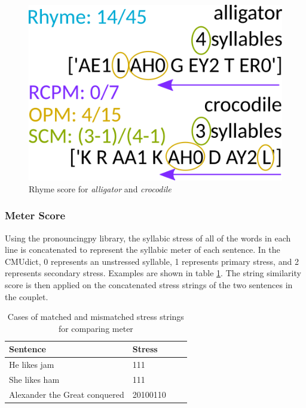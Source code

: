 \documentclass[11pt,a4paper]{article}
\begin{document}
\begin{figure}[h]
    \centering
    \includegraphics[scale=0.45]{rhyme_score.png}
    \caption{Rhyme score for \textit{alligator} and \textit{crocodile}}
    \label{fig:rhymescore}
\end{figure}

\subsubsection{Meter Score}
\label{sec:stressscore}

Using the pronouncingpy library, the syllabic stress of all of the words in each line is concatenated to represent the syllabic meter \cite{meter_def} of each sentence. In the CMUdict, 0 represents an unstressed syllable, 1 represents primary stress, and 2 represents secondary stress.  Examples are shown in table \ref{table:stress}. The \citet{ratcliff} string similarity score is then applied on the concatenated stress strings of the two sentences in the couplet.

\begin{table}
\centering
\begin{tabular}{ll c c}
	\hline\hline
	Sentence & Stress \\ [0.5ex]
	\hline\hline
	He likes jam & 111 \\ [0.5ex]
	\hline
	She likes ham & 111 \\ [0.5ex]
	\hline
	Alexander the Great conquered & 20100110 \\ [0.5ex]
	\hline
\end{tabular}
\caption{Cases of matched and mismatched stress strings for comparing meter}
\label{table:stress}
\end{table}
\end{document}
